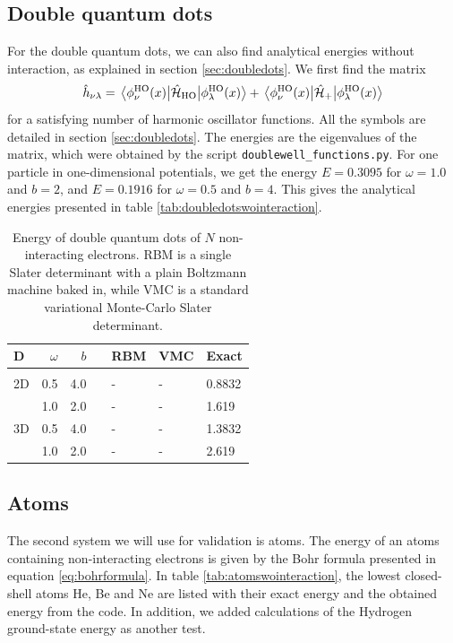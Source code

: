 \subsection{Double quantum dots}
For the double quantum dots, we can also find analytical energies without interaction, as explained in section \ref{sec:doubledots}. We first find the matrix 
\begin{equation*}
\hat{h}_{\nu\lambda}=\mel{\phi_{\nu}^{\text{HO}}(x)}{\hat{\mathcal{H}}_{\text{HO}}}{\phi_{\lambda}^{\text{HO}}(x)}+\mel{\phi_{\nu}^{\text{HO}}(x)}{\hat{\mathcal{H}}_{\text{+}}}{\phi_{\lambda}^{\text{HO}}(x)}
\end{equation*}
for a satisfying number of harmonic oscillator functions. All the symbols are detailed in section \ref{sec:doubledots}. The energies are the eigenvalues of the matrix, which were obtained by the script \texttt{doublewell\_functions.py}. For one particle in one-dimensional potentials, we get the energy $E=0.3095$ for $\omega=1.0$ and $b=2$, and $E=0.1916$ for $\omega=0.5$ and $b=4$. This gives the analytical energies presented in table \eqref{tab:doubledotswointeraction}. 
\begin{table} [H]
	\caption{Energy of double quantum dots of $N$ non-interacting electrons. RBM is a single Slater determinant with a plain Boltzmann machine baked in, while VMC is a standard variational Monte-Carlo Slater determinant.}
	\label{tab:doubledotswointeraction}
	\begin{tabularx}{\textwidth}{lrrrR{3.5cm}R{3.5cm}R{3.5cm}} \hline\hline
		D & $\omega$ & $b$ & \makecell{\\ \phantom{=}} & RBM & VMC & Exact \\ \hline \\
		
		2D & 0.5 & 4.0 && - & - & 0.8832 \\
		& 1.0 & 2.0 && - & - & 1.619 \\
		3D & 0.5 & 4.0 && - & - & 1.3832 \\
		& 1.0 & 2.0 && - & - & 2.619 \\ \hline\hline
	\end{tabularx}
\end{table}

\subsection{Atoms}
The second system we will use for validation is atoms. The energy of an atoms containing non-interacting electrons is given by the Bohr formula presented in equation \eqref{eq:bohrformula}. In table \eqref{tab:atomswointeraction}, the lowest closed-shell atoms He, Be and Ne are listed with their exact energy and the obtained energy from the code. In addition, we added calculations of the Hydrogen ground-state energy as another test.

